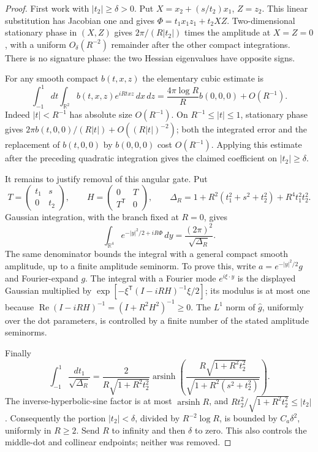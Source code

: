 \begin{proof}
First work with $|t_2|\geq\delta>0$.  Put
$X=x_2+(s/t_2)x_1$, $Z=z_2$.  This linear substitution has Jacobian one
and gives $\Phi=t_1x_1z_1+t_2XZ$.
Two-dimensional stationary phase in $(X,Z)$ gives
$2\pi/(R|t_2|)$ times the amplitude at $X=Z=0$, with a uniform
$O_\delta(R^{-2})$ remainder after the other compact integrations.
There is no signature phase: the two Hessian eigenvalues have opposite
signs.

For any smooth compact $b(t,x,z)$ the elementary cubic estimate is
\[
 \int_{-1}^1\!dt\int_{\mathbb R^2}b(t,x,z)e^{iRtxz}\,dx\,dz
   =\frac{4\pi\log R}{R}b(0,0,0)+O(R^{-1}).
\]
Indeed $|t|<R^{-1}$ has absolute size $O(R^{-1})$.  On
$R^{-1}\leq |t|\leq1$, stationary phase gives
$2\pi b(t,0,0)/(R|t|)+O((R|t|)^{-2})$; both the integrated error
and the replacement of $b(t,0,0)$ by $b(0,0,0)$ cost $O(R^{-1})$.
Applying this estimate after the preceding quadratic integration gives
the claimed coefficient on $|t_2|\geq\delta$.

It remains to justify removal of this angular gate.  Put
\[
 T=\begin{pmatrix}t_1&s\\0&t_2\end{pmatrix},\qquad
 H=\begin{pmatrix}0&T\\T^{\mathsf T}&0\end{pmatrix},\qquad
 \Delta_R=1+R^2(t_1^2+s^2+t_2^2)+R^4t_1^2t_2^2.
\]
Gaussian integration, with the branch fixed at $R=0$, gives
\[
 \int_{\mathbb R^4}e^{-|y|^2/2+iR\Phi}\,dy
       =\frac{(2\pi)^2}{\sqrt{\Delta_R}}.
\]
The same denominator bounds the integral with a general compact smooth
amplitude, up to a finite amplitude seminorm.  To prove this, write
$a=e^{-|y|^2/2}g$ and Fourier-expand $g$.  The integral with a Fourier
mode $e^{i\xi\cdot y}$ is the displayed Gaussian multiplied by
$\exp[-\xi^{\mathsf T}(I-iRH)^{-1}\xi/2]$; its modulus is at most one
because $\operatorname{Re}(I-iRH)^{-1}=(I+R^2H^2)^{-1}\geq0$.
The $L^1$ norm of $\widehat g$, uniformly over the dot parameters,
is controlled by a finite number of the stated amplitude seminorms.

Finally
\[
 \int_{-1}^1\frac{dt_1}{\sqrt{\Delta_R}}
 =\frac{2}{R\sqrt{1+R^2t_2^2}}
   \operatorname{arsinh}\!\left(
    \frac{R\sqrt{1+R^2t_2^2}}{\sqrt{1+R^2(s^2+t_2^2)}}\right).
\]
The inverse-hyperbolic-sine factor is at most
$\operatorname{arsinh}R$, and
$Rt_2^2/\sqrt{1+R^2t_2^2}\leq |t_2|$.
Consequently the portion $|t_2|<\delta$, divided by
$R^{-2}\log R$, is bounded by $C_a\delta^2$, uniformly in $R\geq2$.
Send $R$ to infinity and then $\delta$ to zero.  This also controls
the middle-dot and collinear endpoints; neither was removed.
\end{proof}

